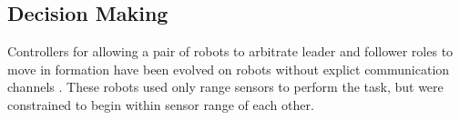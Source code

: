 \documentclass[]{article}
\begin{document}
\subsection{Decision Making}

Controllers for allowing a pair of robots to arbitrate leader and follower roles to move in formation have been evolved on robots without explict communication channels \cite{quinn2001evolving, quinn2003evolving}. 
These robots used only range sensors to perform the task, but were constrained to begin within sensor range of each other. 

%
%
%
\end{document}
